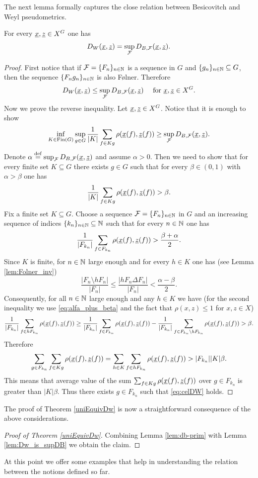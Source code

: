\noindent The next lemma formally captures the close relation between Besicovitch and Weyl pseudometrics.

\begin{lem}\label{lem:Dw_is_supDB}
For every $\underline{x}, \underline{z}\in X^G$ one has
\[ 
D_W(\underline{x}, \underline{z})=\sup_{\operatorname{\mathcal{F}}}D_{B,\operatorname{\mathcal{F}}}(\underline{x}, \underline{z}).
\]
\end{lem}


\begin{proof}
First notice that if $\operatorname{\mathcal{F}}=\{F_n\}_{n\in\mathbb{N}}$ is a \Folner sequence in $G$ and  $\{g_n\}_{n\in\mathbb{N}}\subseteq G$, then the sequence $\{F_ng_n\}_{n\in\mathbb{N}}$ is also F{\o}lner. Therefore 
\[
D_W(\underline{x}, \underline{z})\leq\sup_{\operatorname{\mathcal{F}}}D_{B,\operatorname{\mathcal{F}}}(\underline{x}, \underline{z}) \quad \text{ for } \underline{x},\underline{z}\in X^G.
\]
Now we prove the reverse inequality. Let $\underline{x},\underline{z}\in X^G$. Notice that it is enough to show
\[
\inf_{K\in\operatorname{Fin}(G)}\sup_{g\in G}\frac{1}{ | K|} \sum_{f\in Kg}\rho(\underline{x}(f), \underline{z}(f)) \geq\sup_{\operatorname{\mathcal{F}}}D_{B,\operatorname{\mathcal{F}}}(\underline{x}, \underline{z}).
\]
Denote $\alpha\stackrel{\textup{def}}{=} \sup_{\operatorname{\mathcal{F}}}D_{B,\operatorname{\mathcal{F}}}(\underline{x}, \underline{z})$ and assume $\alpha>0$. Then we need to show that for every finite set $K\subseteq G$ there exists $g\in G$ such that for every $\beta\in(0,1)$ with $\alpha > \beta$ one has
\begin{equation}\label{eq:celDW}
\frac{1}{ | K|} \sum_{f\in Kg}\rho(\underline{x}(f), \underline{z}(f))>\beta. 
\end{equation}
Fix a finite set $K\subseteq G$. Choose a \Folner sequence $\operatorname{\mathcal{F}}=\{F_n\}_{n\in\mathbb{N}}$ in $G$ and an increasing sequence of indices $\{k_n\}_{n\in\mathbb{N}}\subseteq\mathbb{N}$  such that for every $n\in\mathbb{N}$ one has 
\begin{equation}\label{eq:alfa_plus_beta}
\frac{1}{ | F_{k_n}|} \sum_{f\in F_{k_n}} \rho(\underline{x}(f),\underline{z}(f)) >\frac{\beta+\alpha}{2}.
\end{equation} 
Since $K$ is finite, for $n\in\mathbb{N}$ large enough and for every $h\in K$ one has (see Lemma \ref{lem:Folner_inv})
\[
\frac{|F_n\setminus hF_n|}{|F_n|}\leq \frac{|hF_n\Delta F_n|}{|F_n|} < \frac{\alpha-\beta}{2}.
\]
Consequently, for all $n\in\mathbb{N}$ large enough and any $h\in K$ we have (for the second inequality we use \eqref{eq:alfa_plus_beta} and the fact that $\rho(x,z)\leq 1$ for $x,z\in X$)
\[
{1\over |F_{k_n}|} \sum_{f\in hF_{k_n}} \rho(\underline{x}(f),\underline{z}(f)) \geq {1\over | F_{k_n}|} \sum_{f\in F_{k_n}} \rho(\underline{x}(f),\underline{z}(f)) - {1\over |F_{k_n}|} \sum_{f\in F_{k_n}\setminus hF_{k_n}} \rho(\underline{x}(f),\underline{z}(f)) > \beta.
\]
Therefore
\[
\sum_{g\in F_{k_n}} \sum_{f\in Kg}\rho(\underline{x}(f),\underline{z}(f)) = \sum_{h\in K} \sum_{f\in hF_{k_n}}\rho(\underline{x}(f),\underline{z}(f)) > | F_{k_n}|| K|  \beta.
\]
This means that average value of the sum 
$
\sum_{f\in Kg}\rho(\underline{x}(f),\underline{z}(f)) 
$ over $g\in F_{k_n}$ is greater than $| K|  \beta$. Thus there exists $g\in F_{k_n}$ such that \eqref{eq:celDW} holds.
\end{proof}
\noindent 
The proof of Theorem \ref{uniEquivDw} is now a straightforward consequence of the above considerations.
\begin{proof}[Proof of Theorem \ref{uniEquivDw}]
Combining Lemma \ref{lem:db-prim} with Lemma \ref{lem:Dw_is_supDB} we obtain the claim.
\end{proof}
\noindent 
At this point we offer some examples that help in understanding the relation between the notions defined so far.

